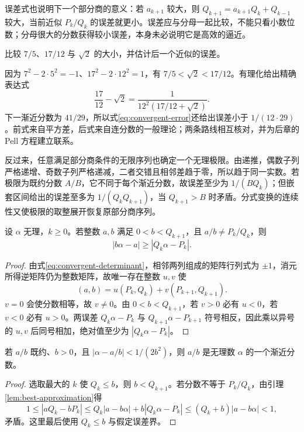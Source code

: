 误差式也说明下一个部分商的意义：若 $a_{k+1}$ 较大，则 $Q_{k+1}=a_{k+1}Q_k+Q_{k-1}$ 较大，当前近似 $P_k/Q_k$ 的误差就更小。误差应与分母一起比较，不能只看小数位数；分母很大的分数获得较小误差，本身未必说明它是高效的逼近。

\begin{example}[不依赖小数展开的误差计算]
比较 $7/5$、$17/12$ 与 $\sqrt2$ 的大小，并估计后一个近似的误差。
\end{example}
\begin{solve}
因为 $7^2-2\cdot5^2=-1$、$17^2-2\cdot12^2=1$，有 $7/5<\sqrt2<17/12$。有理化给出精确表达式
\[
 \frac{17}{12}-\sqrt2
 =\frac{1}{12^2(17/12+\sqrt2)}.
\]
下一渐近分数为 $41/29$，所以式\eqref{eq:convergent-error}还给出误差小于 $1/(12\cdot29)$。前式来自平方差，后式来自连分数的一般理论；两条路线相互核对，并为后章的 Pell 方程建立联系。
\end{solve}

反过来，任意满足部分商条件的无限序列也确定一个无理极限。由递推，偶数子列严格递增、奇数子列严格递减，二者交错且相邻差趋于零，所以趋于同一实数。若极限为既约分数 $A/B$，它不同于每个渐近分数，故误差至少为 $1/(BQ_k)$；但嵌套区间给出的误差至多为 $1/(Q_kQ_{k+1})$，当 $Q_{k+1}>B$ 时矛盾。分式变换的连续性又使极限的取整展开恢复原部分商序列。

\begin{lemma}[第二类逼近性质]
\label{lem:best-approximation}
设 $\alpha$ 无理，$k\ge0$。若整数 $a,b$ 满足 $0<b<Q_{k+1}$，且 $a/b\ne P_k/Q_k$，则
\[
 |b\alpha-a|\ge|Q_k\alpha-P_k|.
\]
\end{lemma}
\begin{proof}
由式\eqref{eq:convergent-determinant}，相邻两列组成的矩阵行列式为 $\pm1$，消元所得逆矩阵仍为整数矩阵，故唯一存在整数 $u,v$ 使
\[
 (a,b)=u(P_k,Q_k)+v(P_{k+1},Q_{k+1}).
\]
$v=0$ 会使分数相等，故 $v\ne0$。由 $0<b<Q_{k+1}$，若 $v>0$ 必有 $u<0$，若 $v<0$ 必有 $u>0$。两误差 $Q_k\alpha-P_k$ 与 $Q_{k+1}\alpha-P_{k+1}$ 符号相反，因此乘以异号的 $u,v$ 后同号相加，绝对值至少为 $|Q_k\alpha-P_k|$。
\end{proof}

\begin{theorem}
\label{thm:legendre-approximation}
若 $a/b$ 既约、$b>0$，且 $|\alpha-a/b|<1/(2b^2)$，则 $a/b$ 是无理数 $\alpha$ 的一个渐近分数。
\end{theorem}
\begin{proof}
选取最大的 $k$ 使 $Q_k\le b$，则 $b<Q_{k+1}$。若分数不等于 $P_k/Q_k$，由引理\ref{lem:best-approximation}得
\[
 1\le|aQ_k-bP_k|
 \le Q_k|a-b\alpha|+b|Q_k\alpha-P_k|
 \le(Q_k+b)|a-b\alpha|<1,
\]
矛盾。这里最后使用 $Q_k\le b$ 与假定误差界。
\end{proof}

